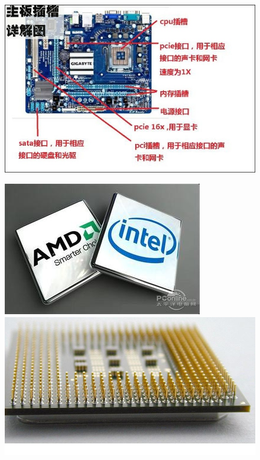 \begin{frame}[fragile]
\begin{figure}[h] 
\centering
\includegraphics[width=\textwidth]{ch01/images/mobo}
\end{figure}
\end{frame}


\begin{frame}[fragile]
\begin{figure}[h] 
\begin{minipage}[t]{0.45\linewidth}
\centering
\includegraphics[width=\textwidth]{ch01/images/cpu1}
\end{minipage}
\hfill
\begin{minipage}[t]{0.45\linewidth}
\centering
\includegraphics[width=\textwidth]{ch01/images/cpu2}
\end{minipage}
\end{figure}
\end{frame}

